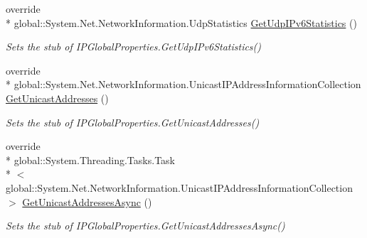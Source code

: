 \begin{DoxyCompactItemize}
override \\*
global\-::\-System.\-Net.\-Network\-Information.\-Udp\-Statistics \hyperlink{class_system_1_1_net_1_1_network_information_1_1_fakes_1_1_stub_i_p_global_properties_ac78a4631fd00497600a5e3901dee4832}{Get\-Udp\-I\-Pv6\-Statistics} ()
\begin{DoxyCompactList}\small\item\em Sets the stub of I\-P\-Global\-Properties.\-Get\-Udp\-I\-Pv6\-Statistics()\end{DoxyCompactList}\item 
override \\*
global\-::\-System.\-Net.\-Network\-Information.\-Unicast\-I\-P\-Address\-Information\-Collection \hyperlink{class_system_1_1_net_1_1_network_information_1_1_fakes_1_1_stub_i_p_global_properties_ae8e58cdbfee85598f0fcaef4ce98adb9}{Get\-Unicast\-Addresses} ()
\begin{DoxyCompactList}\small\item\em Sets the stub of I\-P\-Global\-Properties.\-Get\-Unicast\-Addresses()\end{DoxyCompactList}\item 
override \\*
global\-::\-System.\-Threading.\-Tasks.\-Task\\*
$<$ global\-::\-System.\-Net.\-Network\-Information.\-Unicast\-I\-P\-Address\-Information\-Collection $>$ \hyperlink{class_system_1_1_net_1_1_network_information_1_1_fakes_1_1_stub_i_p_global_properties_abf0b6473dd79fd8eb36941994c074004}{Get\-Unicast\-Addresses\-Async} ()
\begin{DoxyCompactList}\small\item\em Sets the stub of I\-P\-Global\-Properties.\-Get\-Unicast\-Addresses\-Async()\end{DoxyCompactList}\end{DoxyCompactItemize}

